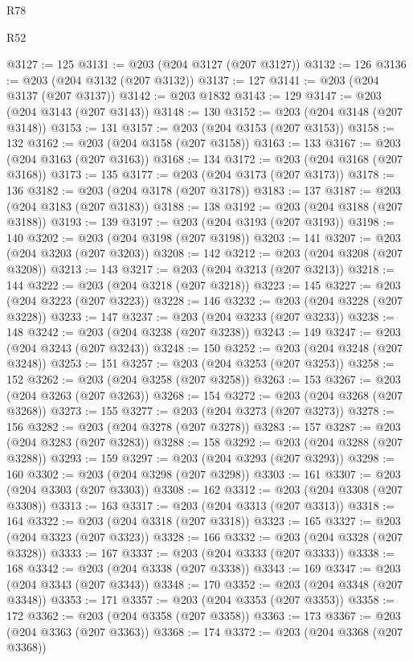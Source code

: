 \begin{lexlean}{R78}
\begin{lexlean}{R52}
\begin{coremodule}
{{{{{{{{{{{{{{{{{{{{{{{{{{{{{{{{{{{{{{{{{{{{{{{{{{{{{{{{{{{{{{{{{{{{{{{{{{{{{{{{{{{{{{{{{{{{{{{{{{{{{{{{{{{{{{{{{{{{{{{{{{{{{{{{{{{{{{{{{{{{{{{{{{{{{{{{{{{{{{{{{{{{{{{{{{{{{{{{{{{{{{{{{{{{{{{{{{{{{{@3127 := 125
@3131 := @203 (@204 @3127 (@207 @3127))
@3132 := 126
@3136 := @203 (@204 @3132 (@207 @3132))
@3137 := 127
@3141 := @203 (@204 @3137 (@207 @3137))
@3142 := @203 @1832
@3143 := 129
@3147 := @203 (@204 @3143 (@207 @3143))
@3148 := 130
@3152 := @203 (@204 @3148 (@207 @3148))
@3153 := 131
@3157 := @203 (@204 @3153 (@207 @3153))
@3158 := 132
@3162 := @203 (@204 @3158 (@207 @3158))
@3163 := 133
@3167 := @203 (@204 @3163 (@207 @3163))
@3168 := 134
@3172 := @203 (@204 @3168 (@207 @3168))
@3173 := 135
@3177 := @203 (@204 @3173 (@207 @3173))
@3178 := 136
@3182 := @203 (@204 @3178 (@207 @3178))
@3183 := 137
@3187 := @203 (@204 @3183 (@207 @3183))
@3188 := 138
@3192 := @203 (@204 @3188 (@207 @3188))
@3193 := 139
@3197 := @203 (@204 @3193 (@207 @3193))
@3198 := 140
@3202 := @203 (@204 @3198 (@207 @3198))
@3203 := 141
@3207 := @203 (@204 @3203 (@207 @3203))
@3208 := 142
@3212 := @203 (@204 @3208 (@207 @3208))
@3213 := 143
@3217 := @203 (@204 @3213 (@207 @3213))
@3218 := 144
@3222 := @203 (@204 @3218 (@207 @3218))
@3223 := 145
@3227 := @203 (@204 @3223 (@207 @3223))
@3228 := 146
@3232 := @203 (@204 @3228 (@207 @3228))
@3233 := 147
@3237 := @203 (@204 @3233 (@207 @3233))
@3238 := 148
@3242 := @203 (@204 @3238 (@207 @3238))
@3243 := 149
@3247 := @203 (@204 @3243 (@207 @3243))
@3248 := 150
@3252 := @203 (@204 @3248 (@207 @3248))
@3253 := 151
@3257 := @203 (@204 @3253 (@207 @3253))
@3258 := 152
@3262 := @203 (@204 @3258 (@207 @3258))
@3263 := 153
@3267 := @203 (@204 @3263 (@207 @3263))
@3268 := 154
@3272 := @203 (@204 @3268 (@207 @3268))
@3273 := 155
@3277 := @203 (@204 @3273 (@207 @3273))
@3278 := 156
@3282 := @203 (@204 @3278 (@207 @3278))
@3283 := 157
@3287 := @203 (@204 @3283 (@207 @3283))
@3288 := 158
@3292 := @203 (@204 @3288 (@207 @3288))
@3293 := 159
@3297 := @203 (@204 @3293 (@207 @3293))
@3298 := 160
@3302 := @203 (@204 @3298 (@207 @3298))
@3303 := 161
@3307 := @203 (@204 @3303 (@207 @3303))
@3308 := 162
@3312 := @203 (@204 @3308 (@207 @3308))
@3313 := 163
@3317 := @203 (@204 @3313 (@207 @3313))
@3318 := 164
@3322 := @203 (@204 @3318 (@207 @3318))
@3323 := 165
@3327 := @203 (@204 @3323 (@207 @3323))
@3328 := 166
@3332 := @203 (@204 @3328 (@207 @3328))
@3333 := 167
@3337 := @203 (@204 @3333 (@207 @3333))
@3338 := 168
@3342 := @203 (@204 @3338 (@207 @3338))
@3343 := 169
@3347 := @203 (@204 @3343 (@207 @3343))
@3348 := 170
@3352 := @203 (@204 @3348 (@207 @3348))
@3353 := 171
@3357 := @203 (@204 @3353 (@207 @3353))
@3358 := 172
@3362 := @203 (@204 @3358 (@207 @3358))
@3363 := 173
@3367 := @203 (@204 @3363 (@207 @3363))
@3368 := 174
@3372 := @203 (@204 @3368 (@207 @3368))
}}}}}}}}}}}}}}}}}}}}}}}}}}}}}}}}}}}}}}}}}}}}}}}}}}}}}}}}}}}}}}}}}}}}}}}}}}}}}}}}}}}}}}}}}}}}}}}}}}}}}}}}}}}}}}}}}}}}}}}}}}}}}}}}}}}}}}}}}}}}}}}}}}}}}}}}}}}}}}}}}}}}}}}}}}}}}}}}}}}}}}}}}}}}}}}}}}}}}}
\end{coremodule}
\end{lexlean}
\end{lexlean}
